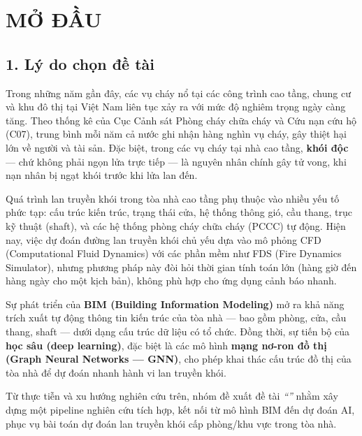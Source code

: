 
\chapter*{MỞ ĐẦU}

\section*{1. Lý do chọn đề tài}

Trong những năm gần đây, các vụ cháy nổ tại các công trình cao tầng, chung cư và khu đô thị tại Việt Nam liên tục xảy ra với mức độ nghiêm trọng ngày càng tăng. Theo thống kê của Cục Cảnh sát Phòng cháy chữa cháy và Cứu nạn cứu hộ (C07), trung bình mỗi năm cả nước ghi nhận hàng nghìn vụ cháy, gây thiệt hại lớn về người và tài sản. Đặc biệt, trong các vụ cháy tại nhà cao tầng, \textbf{khói độc} — chứ không phải ngọn lửa trực tiếp — là nguyên nhân chính gây tử vong, khi nạn nhân bị ngạt khói trước khi lửa lan đến.

Quá trình lan truyền khói trong tòa nhà cao tầng phụ thuộc vào nhiều yếu tố phức tạp: cấu trúc kiến trúc, trạng thái cửa, hệ thống thông gió, cầu thang, trục kỹ thuật (shaft), và các hệ thống phòng cháy chữa cháy (PCCC) tự động. Hiện nay, việc dự đoán đường lan truyền khói chủ yếu dựa vào mô phỏng CFD (Computational Fluid Dynamics) với các phần mềm như FDS (Fire Dynamics Simulator), nhưng phương pháp này đòi hỏi thời gian tính toán lớn (hàng giờ đến hàng ngày cho một kịch bản), không phù hợp cho ứng dụng cảnh báo nhanh.

Sự phát triển của \textbf{BIM (Building Information Modeling)} mở ra khả năng trích xuất tự động thông tin kiến trúc của tòa nhà — bao gồm phòng, cửa, cầu thang, shaft — dưới dạng cấu trúc dữ liệu có tổ chức. Đồng thời, sự tiến bộ của \textbf{học sâu (deep learning)}, đặc biệt là các mô hình \textbf{mạng nơ-ron đồ thị (Graph Neural Networks — GNN)}, cho phép khai thác cấu trúc đồ thị của tòa nhà để dự đoán nhanh hành vi lan truyền khói.

Từ thực tiễn và xu hướng nghiên cứu trên, nhóm đề xuất đề tài \textit{``\detai''} nhằm xây dựng một pipeline nghiên cứu tích hợp, kết nối từ mô hình BIM đến dự đoán AI, phục vụ bài toán dự đoán lan truyền khói cấp phòng/khu vực trong tòa nhà.

